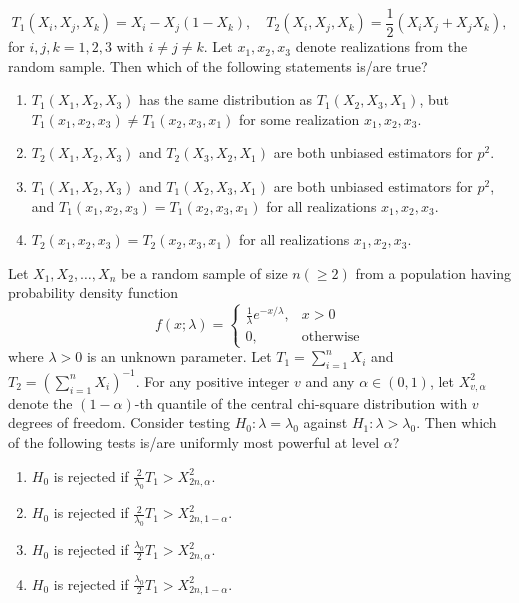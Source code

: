 \[
    T_1(X_i, X_j, X_k) = X_i - X_j(1 - X_k), \quad T_2(X_i, X_j, X_k) = \frac{1}{2} (X_i X_j + X_j X_k),
\]
    for $i, j, k = 1, 2, 3$ with $i \neq j \neq k$. Let $x_1, x_2, x_3$ denote realizations from the random sample. Then which of the following statements is/are true?
    \begin{enumerate}
        \item $T_1(X_1, X_2, X_3)$ has the same distribution as $T_1(X_2, X_3, X_1)$, but $T_1(x_1, x_2, x_3) \neq T_1(x_2, x_3, x_1)$ for some realization $x_1, x_2, x_3$.
        \item $T_2(X_1, X_2, X_3)$ and $T_2(X_3, X_2, X_1)$ are both unbiased estimators for $p^2$.
        \item $T_1(X_1, X_2, X_3)$ and $T_1(X_2, X_3, X_1)$ are both unbiased estimators for $p^2$, and $T_1(x_1, x_2, x_3) = T_1(x_2, x_3, x_1)$ for all realizations $x_1, x_2, x_3$.
        \item $T_2(x_1, x_2, x_3) = T_2(x_2, x_3, x_1)$ for all realizations $x_1, x_2, x_3$.
    \end{enumerate}
    \item Let $X_1, X_2, \dots, X_n$ be a random sample of size $n (\geq 2)$ from a population having probability density function
\[
    f(x; \lambda) = \begin{cases} 
        \frac{1}{\lambda} e^{-x/\lambda}, & x > 0 \\ 
        0, & \text{otherwise} 
    \end{cases}
\]
    where $\lambda > 0$ is an unknown parameter. Let $T_1 = \sum_{i=1}^{n} X_i$ and $T_2 = \left(\sum_{i=1}^{n} X_i\right)^{-1}$. For any positive integer $v$ and any $\alpha \in (0, 1)$, let $X_{v,\alpha}^2$ denote the $(1 - \alpha)$-th quantile of the central chi-square distribution with $v$ degrees of freedom. Consider testing $H_0: \lambda = \lambda_0$ against $H_1: \lambda > \lambda_0$. Then which of the following tests is/are uniformly most powerful at level $\alpha$?
    \begin{enumerate}
        \item $H_0$ is rejected if $\frac{2}{\lambda_0}T_1  > X_{2n, \alpha}^2$.
        \item $H_0$ is rejected if $\frac{2}{\lambda_0}T_1> X_{2n, 1 - \alpha}^2$.
        \item $H_0$ is rejected if $\frac{\lambda_0}{2}T_1 > X_{2n, \alpha}^2$.
        \item $H_0$ is rejected if $\frac{\lambda_0}{2}T_1> X_{2n, 1 - \alpha}^2$.
    \end{enumerate}
    

